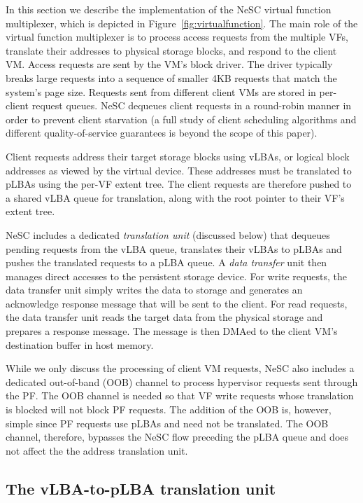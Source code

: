 In this section we describe the implementation of the NeSC virtual function multiplexer, which is depicted in Figure~\ref{fig:virtualfunction}. The main role of the  virtual function multiplexer is to process access requests from the multiple VFs, translate their addresses to physical storage blocks, and respond to the client VM.
%
Access requests are sent by the VM's block driver. The driver typically breaks large requests into a sequence of smaller 4KB requests that match the system's page size. Requests sent from different client VMs are stored in per-client request queues. NeSC dequeues client requests in a round-robin manner in order to prevent client starvation (a full study of client scheduling algorithms and different quality-of-service guarantees is beyond the scope of this paper).

Client requests address their target storage blocks using vLBAs, or logical block addresses as viewed by the virtual device. These addresses must be translated to pLBAs using the per-VF extent tree. The client requests are therefore pushed to a shared vLBA queue for translation, along with the root pointer to their VF's extent tree.

NeSC includes a dedicated \emph{translation unit} (discussed below) that dequeues pending requests from the vLBA queue, translates their vLBAs to pLBAs and pushes the translated requests to a pLBA queue. A \emph{data transfer} unit then manages direct accesses to the persistent storage device. For write requests, the data transfer unit simply writes the data to storage and generates an acknowledge response message that will be sent to the client. For read requests, the data transfer unit reads the target data from the physical storage and prepares a response message. The message is then DMAed to the client VM's destination buffer in host memory.

While we only discuss the processing of client VM requests, NeSC also includes a dedicated out-of-band (OOB) channel to process hypervisor requests sent through the PF. The OOB channel is needed so that VF write requests whose translation is blocked will not block PF requests. The addition of the OOB is, however, simple since PF requests use pLBAs and need not be translated. The OOB channel, therefore, bypasses the NeSC flow preceding the pLBA queue and does not affect the the address translation unit.

\subsection*{The vLBA-to-pLBA translation unit}

